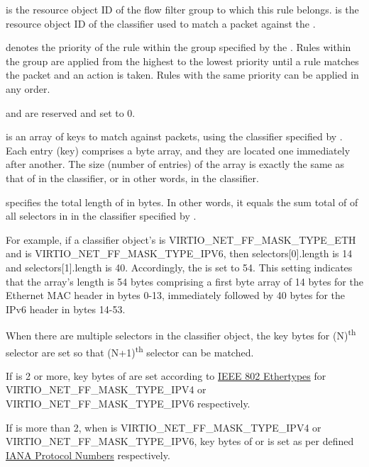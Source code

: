  is the resource object ID of the flow filter group to which
this rule belongs.  is the resource object ID of the
classifier used to match a packet against the .

 denotes the priority of the rule within the group
specified by the .
Rules within the group are applied from the highest to the lowest priority
until a rule matches the packet and an
action is taken. Rules with the same priority can be applied in any order.

 and  are reserved and set to 0.

 is an array of keys to match against packets, using
the classifier specified by . Each entry (key) comprises
a byte array, and they are located one immediately after another.
The size (number of entries) of the array is exactly the same as that of
 in the classifier, or in other words, 
in the classifier.

 specifies the total length of  in bytes.
In other words, it equals the sum total of  of all
selectors in  in the classifier specified by
.

For example, if a classifier object's  is
VIRTIO_NET_FF_MASK_TYPE_ETH and  is
VIRTIO_NET_FF_MASK_TYPE_IPV6,
then selectors[0].length is 14 and selectors[1].length is 40.
Accordingly, the  is set to 54.
This setting indicates that the  array's length is 54 bytes
comprising a first byte array of 14 bytes for the
Ethernet MAC header in bytes 0-13, immediately followed by 40 bytes for the
IPv6 header in bytes 14-53.

When there are multiple selectors in the classifier object, the key bytes
for (N)\textsuperscript{th} selector are set so that
(N+1)\textsuperscript{th} selector can be matched.

If  is 2 or more, key bytes of 
are set according to \hyperref[intro:IEEE 802 Ethertypes]{IEEE 802 Ethertypes}
for VIRTIO_NET_FF_MASK_TYPE_IPV4 or VIRTIO_NET_FF_MASK_TYPE_IPV6 respectively.

If  is more than 2, when  is
VIRTIO_NET_FF_MASK_TYPE_IPV4 or VIRTIO_NET_FF_MASK_TYPE_IPV6, key
bytes of  or  is set as per
 defined \hyperref[intro:IANA Protocol Numbers]{IANA Protocol Numbers}
respectively.

